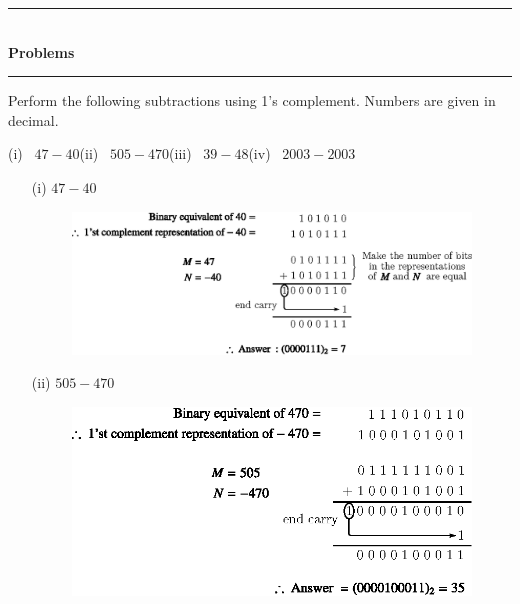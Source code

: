 \eject

\begin{center}
\rule{4cm}{1pt}\\
{\bf\Large Problems}\\[-3pt]
\rule{4cm}{1pt}
\end{center}

\begin{problem}\label{prob5.28}
Perform the following subtractions using 1's complement. Numbers are given in decimal.

\smallskip
(i)~ $47-40$\hfil (ii)~ $505-470$\hfil (iii)~ $39-48$\hfil (iv)~ $2003-2003$
\end{problem}

\begin{solution}
\begin{itemize}
\item[(i)] $47-40$
\begin{figure}[H]
\centering
\includegraphics{chap5/div30.eps}
\end{figure}

\item[(ii)] $505-470$
\begin{figure}[H]
\centering
\includegraphics{chap5/div31.eps}
\end{figure}


\end{itemize}
\end{solution}
